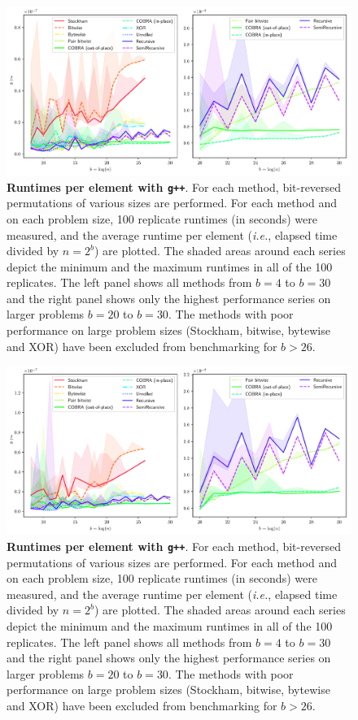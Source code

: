 \documentclass[10pt]{article}
\begin{document}
\begin{figure}[ht!]
\centering
  \includegraphics[width=6in]{results/clang++_run_times.pdf}
\caption{{\bf Runtimes per element with {\tt g++}}. For each method,
  bit-reversed permutations of various sizes are performed. For each
  method and on each problem size, 100 replicate runtimes (in seconds)
  were measured, and the average runtime per element (\emph{i.e.},
  elapsed time divided by $n = 2^b$) are plotted. The shaded areas
  around each series depict the minimum and the maximum runtimes in 
  all of the 100 replicates. The left panel shows all
  methods from $b=4$ to $b=30$ and the right panel shows only the
  highest performance series on larger problems $b=20$ to $b=30$. The
  methods with poor performance on large problem sizes (Stockham,
  bitwise, bytewise and XOR) have been excluded from benchmarking for
  $b>26$.
  \label{fig:clang++_runtimes}	
}
\end{figure}

\begin{figure}[ht!]
\centering
  \includegraphics[width=6in]{results/g++_run_times.pdf}
\caption{{\bf Runtimes per element with {\tt g++}}. For each method,
  bit-reversed permutations of various sizes are performed. For each
  method and on each problem size, 100 replicate runtimes (in seconds)
  were measured, and the average runtime per element (\emph{i.e.},
  elapsed time divided by $n = 2^b$) are plotted. The shaded areas
  around each series depict the minimum and the maximum runtimes in 
  all of the 100 replicates. The left panel shows all
  methods from $b=4$ to $b=30$ and the right panel shows only the
  highest performance series on larger problems $b=20$ to $b=30$. The
  methods with poor performance on large problem sizes (Stockham,
  bitwise, bytewise and XOR) have been excluded from benchmarking for
  $b>26$.
  \label{fig:g++_runtimes}	
}
\end{figure}
\end{document}
